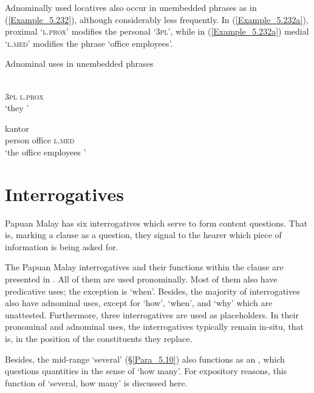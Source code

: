 Adnominally used locatives also occur in unembedded  phrases as in (\ref{Example_5.232}), although considerably less frequently. In (\ref{Example_5.232a}), proximal  ‘\textsc{l.prox}’ modifies the personal   ‘\textsc{3pl}’, while in (\ref{Example_5.232a}) medial  ‘\textsc{l.med}’ modifies the  phrase  ‘office employees’.


\begin{styleExampleTitle}
Adnominal uses in unembedded  phrases
\end{styleExampleTitle}

\ea
\label{Example_5.232}
\ea
\label{Example_5.232a}
 {}\\
\textsc{3pl}  \textsc{l.prox}\\
\glt ‘they {’ \textstyleExampleSource{[080922-001a-CvPh.0556]}}\\
\vspace{5pt}

\ex
\label{Example_5.232b}
 {kantor} {}\\
person  office  \textsc{l.med}\\
\glt ‘the office employees ’ \textstyleExampleSource{[081005-001-Cv.0018]}
\z
\z


\section{Interrogatives}
\label{Para_5.8}
Papuan Malay has six interrogatives which serve to form content questions. That is, marking a clause as a question, they signal to the hearer which piece of information is being asked for.



The Papuan Malay interrogatives and their functions within the clause are presented in  . All of them are used pronominally. Most of them also have predicative uses; the exception is  ‘when’. Besides, the majority of interrogatives also have adnominal uses, except for  ‘how’,  ‘when’, and  ‘why’ which are unattested. Furthermore, three interrogatives are used as placeholders. In their pronominal and adnominal uses, the interrogatives typically remain in-situ, that is, in the position of the constituents they replace.



Besides, the mid-range   ‘several’ (§\ref{Para_5.10}) also functions as an , which questions quantities in the sense of ‘how many’. For expository reasons, this  function of   ‘several, how many’ is discussed here.


